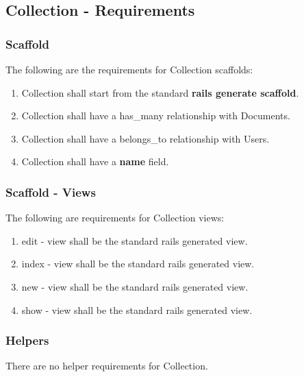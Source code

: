 \subsection{Collection - Requirements}
\label{sec:document_spec} 

\subsubsection{Scaffold}
The following are the requirements for Collection scaffolds:
\begin{enumerate}
	\item Collection shall start from the standard \textbf{rails generate scaffold}.
	\item Collection shall have a has\_many relationship with Documents.
	\item Collection shall have a belongs\_to relationship with Users.
	\item Collection shall have a \textbf{name} field.
\end{enumerate}

\subsubsection{Scaffold - Views}
The following are requirements for Collection views:
\begin{enumerate}
	\item edit - view shall be the standard rails generated view. 

	\item index - view shall be the standard rails generated view. 
	
	\item new - view shall be the standard rails generated view. 
	
	\item show - view shall be the standard rails generated view. 

\end{enumerate}


\subsubsection{Helpers}
There are no helper requirements for Collection.
